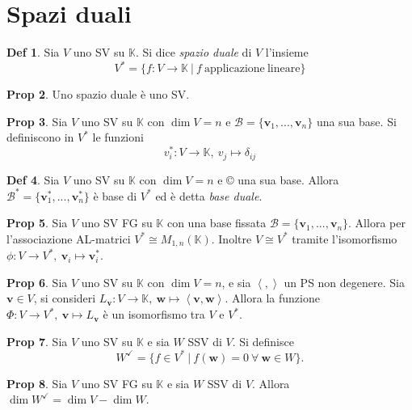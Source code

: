 \documentclass[]{article}
\newcommand{\vv}{\mathbf{v}}
\newcommand{\vw}{\mathbf{w}}
\newcommand{\scalprod}[2]{\left\langle #1 , #2 \right\rangle}
\theoremstyle{definition}
\theoremstyle{definition}
\newtheorem{prop}{Prop}[subsection]
\theoremstyle{definition}
\newtheorem{dfn}[prop]{Def}
\begin{document}
\section{Spazi duali} 

\begin{dfn} Sia $V$ uno SV su $\mathbb{K}$. Si dice \emph{spazio duale} di $V$ l'insieme
$$V^{*}=\{ f:V \to \mathbb{K} \ | \ f \ \mathrm{applicazione \ lineare} \}$$

\end{dfn} \begin{prop} Uno spazio duale è uno SV.

\end{prop} \begin{prop} Sia $V$ uno SV su $\mathbb{K}$ con $\dim V = n$ e $\mathcal{B}=\{ \vv _1 , ... , \vv _n \}$ una sua base. Si definiscono in $V^*$ le funzioni 
$$v^* _i :V \to \mathbb{K}, \ v_j \mapsto \delta _{ij} $$

\end{prop}  \begin{dfn} Sia $V$ uno SV su $\mathbb{K}$ con $\dim V = n$ e © una sua base. Allora $\mathcal{B}^*=\{ \vv ^* _1 , ... , \vv ^* _n \}$ è base di $V^*$ ed è detta \emph{base duale}.

 \end{dfn} \begin{prop} Sia $V$ uno SV FG su $\mathbb{K}$ con una base fissata $\mathcal{B}=\{ \vv _1 , ... , \vv _n \}$. Allora per l'associazione AL-matrici $V^* \cong M_{1,n}(\mathbb{K})$. Inoltre $V \cong V^*$ tramite l'isomorfismo $\phi : V \to V^*,\ \vv_i \mapsto \vv_i ^*$.

\end{prop} \begin{prop} Sia $V$ uno SV su $\mathbb{K}$ con $\dim V = n$, e sia $\scalprod{}{}$ un PS non degenere. Sia $\vv \in V$, si consideri $L_{\vv}:V \to \mathbb{K}, \ \vw \mapsto \scalprod{\vv}{\vw}$. Allora la funzione $\Phi :V \to V^*, \ \vv \mapsto L_{\vv}$ è un isomorfismo tra $V$ e $V^*$.

\end{prop} \begin{prop} Sia $V$ uno SV su $\mathbb{K}$ e sia $W$ SSV di $V$. Si definisce
$$W^{\checkmark} = \{ f \in V^* \ | \ f(\vw ) = 0 \ \forall \ \vw \in W \}.$$

\end{prop} \begin{prop} Sia $V$ uno SV FG su $\mathbb{K}$ e sia $W$ SSV di $V$. Allora $\dim W^{\checkmark}= \dim V - \dim W$.


\end{prop}
\end{document}
